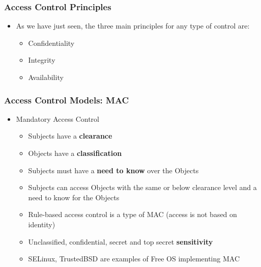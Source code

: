 \documentclass{beamer}
\begin{document}
\begin{frame}
\frametitle{Access Control Principles}

\begin{itemize}
\item As we have just seen, the three main principles for any type of control are:
\begin{itemize}
\item Confidentiality
\item Integrity
\item Availability
\end{itemize}
\end{itemize}

\end{frame}


\begin{frame}
\frametitle{Access Control Models: MAC}

\begin{itemize}
\item Mandatory Access Control
    \begin{itemize}
    \item Subjects have a {\bf clearance}
    \item Objects have a {\bf classification}
    \item Subjects must have a {\bf need to know} over the Objects
    \item Subjects can access Objects with the same or below clearance level and a need to know for the Objects
    \item Rule-based access control is a type of MAC (access is not based on identity)
    \item Unclassified, confidential, secret and top secret {\bf sensitivity}
    \item SELinux, TrustedBSD are examples of Free OS implementing MAC
    \end{itemize}
\end{itemize}

\end{frame}

\end{document}

